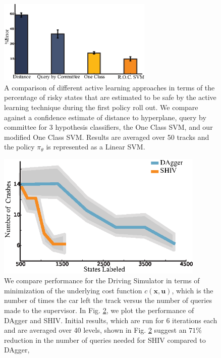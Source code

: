 \documentclass[10pt, conference]{ieeeconf}      %
\newcommand{\bu}{\mathbf{u}}
\newcommand{\bx}{\mathbf{x}}
\begin{document}
\begin{figure}[t]
\centering
\includegraphics[width=\columnwidth, height=4cm]{figures/risk_bar.eps}
\caption {  A comparison of different active learning approaches in terms of the percentage of risky states that are estimated to be safe by the active learning technique during the first policy roll out. We compare against a confidence estimate of distance to hyperplane, query by committee for 3 hypothesis classifiers, the One Class SVM, and our modified One Class SVM.  Results  are averaged over 50 tracks and the policy $\pi_\theta$ is represented as a Linear SVM. 
   }

\label{fig:active_comp}
\end{figure}



\begin{figure}[t!]
\centering
\includegraphics[width=\columnwidth, height=6cm]{figures/dagger_shiv_one_class.eps}
\caption{We compare performance for the Driving Simulator in terms of minimization of the underlying cost function $c(\bx,\bu)$, which is the  number of times the car left the track versus the number of queries made to the supervisor. In Fig. \ref{fig:car_cost}, we plot the performance of DAgger and SHIV.  Initial results, which are run for 6 iterations each and are averaged over 40 levels, shown in Fig. \ref{fig:car_cost} suggest an $71\%$ reduction in the number of queries needed for SHIV compared to DAgger,}
\vspace*{-10pt}
\label{fig:car_cost}
\end{figure}
\end{document}
